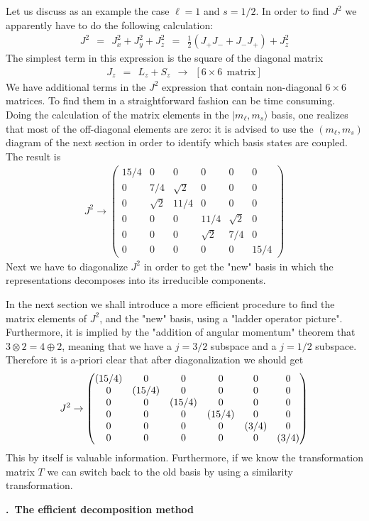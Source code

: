 \documentclass[onecolumn,fleqn, 11pt]{revtex4}
\newcommand{\amatrix}[1]{\begin{matrix} #1 \end{matrix}}
\newcommand{\beq}{\begin{eqnarray}}
\newcommand{\eeq}{\end{eqnarray}}
\renewcommand{\thesubsection}{\arabic{subsection}}
\renewcommand{\thesubsubsection}{\arabic{subsubsection}}
\newcommand{\sheadC}[1]
{
\addtocounter{subsubsection}{1}
\vspace{5mm}
{\bf \thesubsection.\thesubsubsection \ #1}  
\nopagebreak
\phantomsection
}
\begin{document}
Let us discuss as an example the case $\ell=1$ and $s=1/2$. 
In order to find $J^2$ we apparently have to do 
the following calculation: 
\beq
J^2 
\ \ = \ \  
J_x^2+J_y^2+J_z^2
\ \ = \ \ 
\frac{1}{2}\left(J_{+}J_{-} + J_{-}J_{+} \right) + J_z^2
\eeq
The simplest term in this expression 
is the square of the diagonal matrix 
\beq
J_z \ \ =  \ \ L_z + S_z \ \ \rightarrow \ \ \left[ 6 \times 6 \ \ \mbox{matrix} \right] 
\eeq
We have additional terms in the $J^2$ expression 
that contain non-diagonal ${ 6\times6 }$ matrices. 
To find them in a straightforward fashion can be time consuming.  
Doing the calculation of the matrix elements 
in the $|m_{\ell},m_{s}\rangle$ basis, 
one realizes that most of the off-diagonal 
elements are zero: it is advised to use 
the $(m_{\ell},m_{s})$ diagram of the next section   
in order to identify which basis states are coupled.
The result is 
\beq
J^2 \rightarrow 
\left(
\begin{array}{cccccc}
{15}/{4} & 0 & 0 & 0 & 0 & 0 \\
0 & {7}/{4} & \sqrt{2} & 0 & 0 & 0 \\
0 & \sqrt{2} & 11/4 & 0 & 0 & 0 \\
0 & 0 & 0 & 11/4 & \sqrt{2} & 0 \\
0 & 0 & 0 & \sqrt{2} & {7}/{4} & 0 \\
0 & 0 & 0 & 0 & 0 & {15}/{4} 
\end{array}
\right)
\eeq
Next we have to diagonalize $J^2$ in order to get 
the "new" basis in which the representations decomposes 
into its irreducible components.  

In the next section we shall introduce a more efficient procedure 
to find the matrix elements of $J^2$, and the "new" basis, 
using a "ladder operator picture". Furthermore, it is implied by the 
"addition of angular momentum" theorem that $ 3\otimes 2 = 4 \oplus 2$, 
meaning that we have a $j=3/2$ subspace and a $j=1/2$ subspace.  
Therefore it is a-priori clear that after diagonalization we should get 
\beq
J^2 \rightarrow 
\left( 
\amatrix{ 
(15/4) & 0 & 0 & 0 & 0 & 0 \cr 
0 & (15/4) & 0 & 0 & 0 & 0 \cr 
0 & 0 & (15/4) & 0 & 0 & 0 \cr 
0 & 0 & 0 & (15/4) & 0 & 0 \cr 
0 & 0 & 0 & 0 & (3/4) & 0 \cr 
0 & 0 & 0 & 0 & 0 & (3/4) } 
\right) 
\eeq
This by itself is valuable information. Furthermore, if we know the transformation 
matrix $T$ we can switch back to the old basis by using a similarity transformation.  



\sheadC{The efficient decomposition method}
\end{document}

